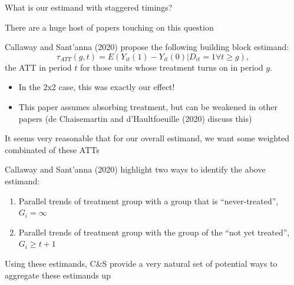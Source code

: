 \documentclass[notes,11pt, aspectratio=169]{beamer}
\newenvironment{wideitemize}{\itemize\addtolength{\itemsep}{10pt}}{\enditemize}
\begin{document}
\begin{frame}{What is our estimand with staggered timings?}
	\begin{wideitemize}
		\item There are a huge host of papers touching on this question
		\item Callaway and Sant'anna (2020) propose the following building block estimand:
		\begin{equation}
			\tau_{ATT}(g,t) = E(Y_{it}(1) - Y_{it}(0) | D_{it} = 1 \forall t \geq g),
		\end{equation}
		the ATT in period $t$ for those units whose treatment turns on in period $g$.
		\begin{itemize}
			\item In the 2x2 case, this was exactly our effect!
			\item This paper assumes absorbing treatment, but can be weakened in
			      other papers (de Chaisemartin and d'Haultfoeuille (2020) discuss
			      this)
		\end{itemize}
		\item It seems very reasonable that for our overall estimand, we
		want some weighted combinated of these ATTs
		\item Callaway and Sant'anna (2020) highlight two ways to identify the above estimand:
		\begin{enumerate}
			\item Parallel trends of treatment group with a group that is ``never-treated'',  $G_{i} = \infty$
			\item Parallel trends of treatment group with the group of the ``not yet treated'',   $G_{i} \geq t + 1$
		\end{enumerate}
		\item Using these estimands, C\&S provide a very natural set of
		potential ways to aggregate these estimands up
	\end{wideitemize}

\end{frame}
\end{document}
